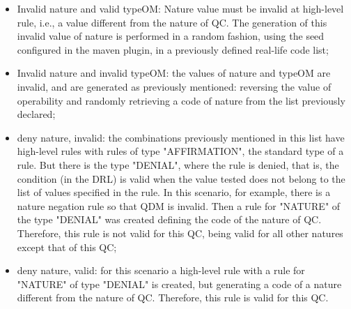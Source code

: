 \begin{itemize}
\item Invalid nature and valid typeOM: Nature value must be invalid at high-level rule, i.e., a value different from the nature of QC. The generation of this invalid value of nature is performed in a random fashion, using the seed configured in the maven plugin, in a previously defined real-life code list;


\item Invalid nature and invalid typeOM: the values of nature and typeOM are invalid, and are generated as previously mentioned: reversing the value of operability and randomly retrieving a code of nature from the list previously declared;


\item deny nature, invalid: the combinations previously mentioned in this list have high-level rules with rules of type "AFFIRMATION", the standard type of a rule. But there is the type "DENIAL", where the rule is denied, that is, the condition (in the DRL) is valid when the value tested does not belong to the list of values specified in the rule. In this scenario, for example, there is a nature negation rule so that QDM is invalid. Then a rule for "NATURE" of the type "DENIAL" was created defining the code of the nature of QC. Therefore, this rule is not valid for this QC, being valid for all other natures except that of this QC;


\item deny nature, valid: for this scenario a high-level rule with a rule for "NATURE" of type "DENIAL" is created, but generating a code of a nature different from the nature of QC. Therefore, this rule is valid for this QC.
\end{itemize}

